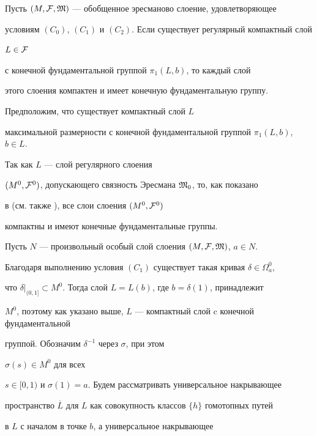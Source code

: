 \begin{thm}\label{T1}


Пусть $(M,{\cal F},\frak M)$ --- обобщенное эресманово слоение, удовлетворяющее


условиям $(C_0)$, $(C_1)$ и $(C_2)$. Если существует регулярный компактный слой


$L\in \cal F$


с конечной фундаментальной группой $\pi_1(L,b)$, то каждый слой


этого слоения компактен и имеет конечную фундаментальную группу.


\end{thm}





\begin{pf}


Предположим, что существует компактный слой $L$


максимальной размерности с конечной фундаментальной группой $\pi_1(L,b)$, $b\in L$.


Так как $L$ --- слой регулярного слоения


$(M^0,{\cal F}^0)$, допускающего связность Эресмана ${\frak M}_0$, то, как показано


в \cite{Z2} (см. также \cite{Z3}), все слои слоения $(M^0,{\cal F}^0)$


компактны и  имеют конечные фундаментальные группы.





Пусть $N$ --- произвольный особый слой слоения $(M,{\cal F},\frak M)$, $a\in N$.


Благодаря выполнению условия $(C_1)$ существует такая кривая $\delta\in\Omega^0_a$,


что $\delta|_{(0,1]}\subset M^0$. Тогда слой $L=L(b)$, где $b=\delta(1)$, принадлежит


$M^0$, поэтому как указано выше, $L$ --- компактный слой c конечной фундаментальной


группой. Обозначим $\delta^{-1}$ через $\sigma$, при этом


$\sigma(s)\in M^0$ для всех


$s\in [0,1)$ и $\sigma(1)=a$. Будем рассматривать универсальное накрывающее


пространство $\overline{L}$ для $L$ как совокупность классов $\{h\}$ гомотопных путей


в $L$ с началом в точке $b$, а универсальное накрывающее



\end{pf}
